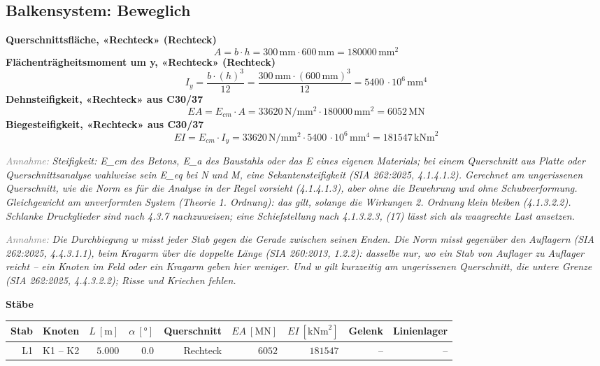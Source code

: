 \documentclass[11pt,a4paper]{article}
\newcommand{\hinweis}[2]{\par\noindent\textcolor{gray}{\textit{#1:}} \textit{#2}\par}
\begin{document}
\subsection{Balkensystem: Beweglich}
\noindent\textbf{Querschnittsfläche, «Rechteck» (Rechteck)}
\begin{equation*}
A = b \cdot h = 300\,\mathrm{mm} \cdot 600\,\mathrm{mm} = 180000\,\mathrm{mm}^{2}
\end{equation*}
\noindent\textbf{Flächenträgheitsmoment um y, «Rechteck» (Rechteck)}
\begin{equation*}
I_y = \frac{b \cdot \left(h\right)^{3}}{12} = \frac{300\,\mathrm{mm} \cdot \left(600\,\mathrm{mm}\right)^{3}}{12} = 5400\,\cdot 10^{6}\,\mathrm{mm}^{4}
\end{equation*}
\noindent\textbf{Dehnsteifigkeit, «Rechteck» aus C30/37}
\begin{equation*}
EA = E_{cm} \cdot A = 33620\,\mathrm{N}/\mathrm{mm}^{2} \cdot 180000\,\mathrm{mm}^{2} = 6052\,\mathrm{MN}
\end{equation*}
\noindent\textbf{Biegesteifigkeit, «Rechteck» aus C30/37}
\begin{equation*}
EI = E_{cm} \cdot I_y = 33620\,\mathrm{N}/\mathrm{mm}^{2} \cdot 5400\,\cdot 10^{6}\,\mathrm{mm}^{4} = 181547\,\mathrm{kNm}^{2}
\end{equation*}
\hinweis{Annahme}{Steifigkeit: E\_cm des Betons, E\_a des Baustahls oder das E eines eigenen Materials; bei einem Querschnitt aus Platte oder Querschnittsanalyse wahlweise sein E\_eq bei N und M, eine Sekantensteifigkeit (SIA 262:2025, 4.1.4.1.2). Gerechnet am ungerissenen Querschnitt, wie die Norm es für die Analyse in der Regel vorsieht (4.1.4.1.3), aber ohne die Bewehrung und ohne Schubverformung. Gleichgewicht am unverformten System (Theorie 1. Ordnung): das gilt, solange die Wirkungen 2. Ordnung klein bleiben (4.1.3.2.2). Schlanke Druckglieder sind nach 4.3.7 nachzuweisen; eine Schiefstellung nach 4.1.3.2.3, (17) lässt sich als waagrechte Last ansetzen.}
\hinweis{Annahme}{Die Durchbiegung w misst jeder Stab gegen die Gerade zwischen seinen Enden. Die Norm misst gegenüber den Auflagern (SIA 262:2025, 4.4.3.1.1), beim Kragarm über die doppelte Länge (SIA 260:2013, 1.2.2): dasselbe nur, wo ein Stab von Auflager zu Auflager reicht – ein Knoten im Feld oder ein Kragarm geben hier weniger. Und w gilt kurzzeitig am ungerissenen Querschnitt, die untere Grenze (SIA 262:2025, 4.4.3.2.2); Risse und Kriechen fehlen.}
\noindent\textbf{Stäbe}
\begin{longtable}{rrrrrrrrr}
\hline
Stab & Knoten & $L\ [\mathrm{m}]$ & $\alpha\ [°]$ & Querschnitt & $EA\ [\mathrm{MN}]$ & $EI\ [\mathrm{kNm}^{2}]$ & Gelenk & Linienlager \\
\hline
\endhead
L1 & K1 – K2 & $5.000$ & $0.0$ & Rechteck & $6052$ & $181547$ & – & – \\
\hline
\end{longtable}
\end{document}
